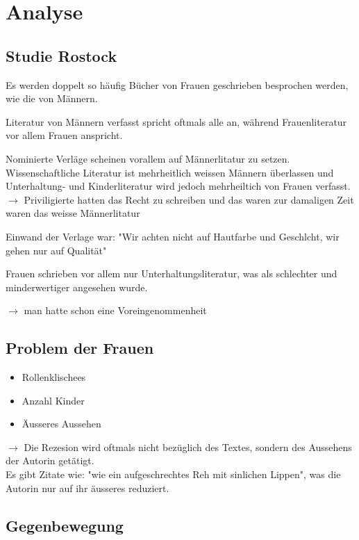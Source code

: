 \documentclass{article}
\begin{document}


\section{Analyse}
\subsection{Studie Rostock}
Es werden doppelt so häufig Bücher von Frauen geschrieben besprochen werden, wie die von Männern.

Literatur von Männern verfasst spricht oftmals alle an, während Frauenliteratur vor allem Frauen anspricht.

Nominierte Verläge scheinen vorallem auf Männerlitatur zu setzen. Wissenschaftliche Literatur ist mehrheitlich weissen Männern überlassen und Unterhaltung- und Kinderliteratur wird jedoch mehrheiltich von Frauen verfasst. \\

$\rightarrow$ Priviligierte hatten das Recht zu schreiben und das waren zur damaligen Zeit waren das weisse Männerlitatur

Einwand der Verlage war: "Wir achten nicht auf Hautfarbe und Geschlcht, wir gehen nur auf Qualität"

Frauen schrieben vor allem nur Unterhaltungsliteratur, was als schlechter und minderwertiger angesehen wurde.

$\rightarrow$ man hatte schon eine Voreingenommenheit

\subsection{Problem der Frauen}
\begin{itemize}
    \item Rollenklischees
    \item Anzahl Kinder
    \item Äusseres Aussehen

\end{itemize}
$\rightarrow$ Die Rezesion wird oftmals nicht bezüglich des Textes, sondern des Aussehens der Autorin getätigt.\\

Es gibt Zitate wie: "wie ein aufgeschrechtes Reh mit sinlichen Lippen", was die Autorin nur auf ihr äusseres reduziert.

\subsection{Gegenbewegung}
\end{document}
